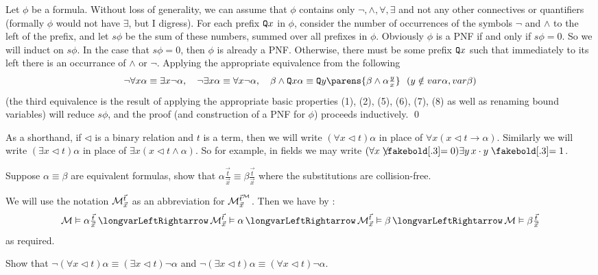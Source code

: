 Let $\phi$ be a formula.
Without loss of generality, we can assume that $\phi$ contains only $\neg,\land,\forall,\exists$ and not any other connectives or quantifiers (formally $\phi$ would not have $\exists$, but I digress).
For each prefix ${\tt Q} x$ in $\phi$, consider the number of occurrences of the symbols $\neg$ and $\land$ to the left of the prefix, and let $s\phi$ be the sum of these numbers, summed over all prefixes in
$\phi$.
Obviously $\phi$ is a PNF if and only if $s\phi=0$.
So we will induct on $s\phi$.
In the case that $s\phi=0$, then $\phi$ is already a PNF.
Otherwise, there must be some prefix ${\tt Q} x$ such that immediately to its left there is an occurrance of $\land$ or $\neg$.
Applying the appropriate equivalence from the following
$$ \neg\forall x\alpha\equiv\exists x\neg\alpha,\quad \neg\exists x\alpha\equiv\forall x\neg\alpha,\quad \beta\land\Q x\alpha\equiv\Q y\parens{\beta\land\alpha\tfrac yx}\ \ (y\notin\var\alpha,\var\beta) $$
(the third equivalence is the result of applying the appropriate basic properties (1), (2), (5), (6), (7), (8) as well as renaming bound variables)
will reduce $s\phi$, and the proof (and construction of a PNF for $\phi$) proceeds inductively.
\qed

As a shorthand, if $\triangleleft$ is a binary relation and $t$ is a term, then we will write $(\forall x\triangleleft t)\alpha$ in place of $\forall x(x\triangleleft t\to\alpha)$.
Similarly we will write $(\exists x\triangleleft t)\alpha$ in place of $\exists x(x\triangleleft t\land\alpha)$.
So for example, in fields we may write $(\forall x\neqb0)\exists y\,x\cdot y\eq1$.

\bexerc

    Suppose $\alpha\equiv\beta$ are equivalent formulas, show that $\alpha\frac{\vec t}{\vec x}\equiv\beta\frac{\vec t}{\vec x}$ where the substitutions are collision-free.

\eexerc

We will use the notation ${\cal M}^{\vec t}_{\vec x}$ as an abbreviation for ${\cal M}^{\vec t^{\cal M}}_{\vec x}$.
Then we have by :
$$ {\cal M}\vDash\alpha\tfrac{\vec t}{\vec x} \iff {\cal M}^{\vec t}_{\vec x}\vDash\alpha \iff {\cal M}^{\vec t}_{\vec x}\vDash\beta \iff {\cal M}\vDash\beta\tfrac{\vec t}{\vec x} $$
as required.

\bexerc

    Show that $\neg(\forall x\triangleleft t)\alpha\equiv(\exists x\triangleleft t)\neg\alpha$ and $\neg(\exists x\triangleleft t)\alpha\equiv(\forall x\triangleleft t)\neg\alpha$.

